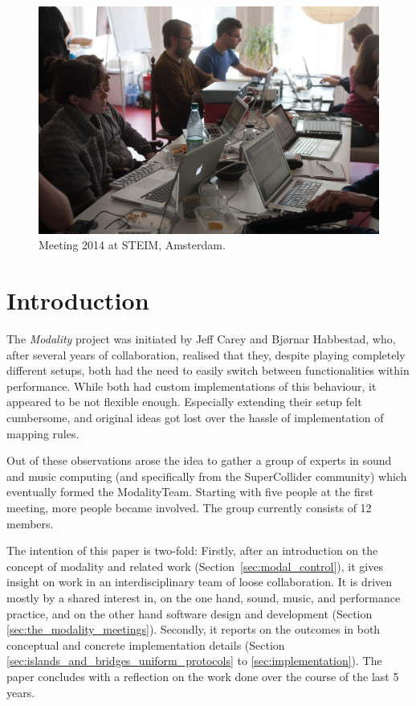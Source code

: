 \documentclass{article}
\begin{document}
\begin{figure}[h]
	\centering
		\includegraphics[width=.9\columnwidth]{../media/20140331-IMG_5976.jpg}
	\caption{Meeting 2014 at STEIM, Amsterdam.}
	\label{fig:media_20140331-IMG_5976}
\end{figure}

\section{Introduction}
\label{sec:introduction}

The \textit{Modality} project was initiated by Jeff Carey and Bj\o{}rnar Habbestad, who, after several years of collaboration, realised that they, despite playing completely different setups, both had the need to easily switch between functionalities  within performance.
While both had custom implementations of this behaviour, it appeared to be not flexible enough. 
Especially extending their setup felt cumbersome, and original ideas got lost over the hassle of implementation of mapping rules.

Out of these observations arose the idea to gather a group of experts in sound and music computing (and specifically from the SuperCollider community) which eventually formed the ModalityTeam.
Starting with five people at the first meeting, more people became involved. The group currently consists of 12 members.

The intention of this paper is two-fold:
%
Firstly, after an introduction on the concept of modality and related work (Section~\ref{sec:modal_control}), it gives insight on work in an interdisciplinary team of loose collaboration.
It is driven mostly by a shared interest in, on the one hand, sound, music, and performance practice, and on the other hand software design and development (Section \ref{sec:the_modality_meetings}).
%
Secondly, it reports on the outcomes in both conceptual and concrete implementation details (Section \ref{sec:islands_and_bridges_uniform_protocols} to \ref{sec:implementation}).
The paper concludes with a reflection on the work done over the course of the last 5 years.
\end{document}
